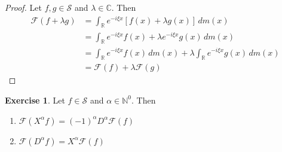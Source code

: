 \documentclass[12pt]{amsart}
\theoremstyle{definition}
\newtheorem{ex}[definition]{Exercise}
\newcommand{\al}{\alpha}
\newcommand{\lam}{\lambda}
\newcommand{\C}{\mathbb{C}}
\newcommand{\N}{\mathbb{N}}
\newcommand{\R}{\mathbb{R}}
\newcommand{\MF}{\mathcal{F}}
\newcommand{\MS}{\mathcal{S}}
\newcommand{\dm}{\, d m}
\begin{document}
	\begin{proof}
		Let $f,g \in \MS$ and $\lam \in \C$. Then 
		\begin{align*}
			\MF(f + \lam g) 
			& = \int_{\R} e^{-i \xi x} [f(x) + \lam g(x)] \dm(x) \\
			& = \int_{\R} e^{-i \xi x} f(x) + \lam e^{-i \xi x} g(x) \dm(x) \\
			& = \int_{\R} e^{-i \xi x} f(x) \dm(x) + \lam \int_{\R} e^{-i \xi x} g(x) \dm(x) \\
			&= \MF(f) + \lam \MF(g)
		\end{align*}
	\end{proof}

	\begin{ex}
		Let $f \in \MS$ and $\al \in \N^0$. Then 
		\begin{enumerate}
			\item $\MF(X^{\al}f) = (-1)^{\al}D^{\al} \MF(f)$ 
			\item $\MF(D^{\al}f) = X^{\al} \MF(f)$
		\end{enumerate}
	\end{ex}
	
\end{document}
